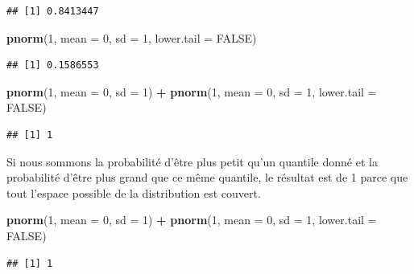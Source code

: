 \documentclass[
]{book}
\newenvironment{Shaded}{\begin{snugshade}}{\end{snugshade}}
\newcommand{\AttributeTok}[1]{\textcolor[rgb]{0.13,0.29,0.53}{#1}}
\newcommand{\ConstantTok}[1]{\textcolor[rgb]{0.56,0.35,0.01}{#1}}
\newcommand{\DecValTok}[1]{\textcolor[rgb]{0.00,0.00,0.81}{#1}}
\newcommand{\FunctionTok}[1]{\textcolor[rgb]{0.13,0.29,0.53}{\textbf{#1}}}
\newcommand{\NormalTok}[1]{#1}
\newcommand{\SpecialCharTok}[1]{\textcolor[rgb]{0.81,0.36,0.00}{\textbf{#1}}}
\begin{document}
\begin{verbatim}
## [1] 0.8413447
\end{verbatim}

\begin{Shaded}
\begin{Highlighting}[]
\FunctionTok{pnorm}\NormalTok{(}\DecValTok{1}\NormalTok{, }\AttributeTok{mean =} \DecValTok{0}\NormalTok{, }\AttributeTok{sd =} \DecValTok{1}\NormalTok{, }\AttributeTok{lower.tail =} \ConstantTok{FALSE}\NormalTok{)}
\end{Highlighting}
\end{Shaded}

\begin{verbatim}
## [1] 0.1586553
\end{verbatim}

\begin{Shaded}
\begin{Highlighting}[]
\FunctionTok{pnorm}\NormalTok{(}\DecValTok{1}\NormalTok{, }\AttributeTok{mean =} \DecValTok{0}\NormalTok{, }\AttributeTok{sd =} \DecValTok{1}\NormalTok{) }\SpecialCharTok{+} \FunctionTok{pnorm}\NormalTok{(}\DecValTok{1}\NormalTok{, }\AttributeTok{mean =} \DecValTok{0}\NormalTok{, }\AttributeTok{sd =} \DecValTok{1}\NormalTok{, }\AttributeTok{lower.tail =} \ConstantTok{FALSE}\NormalTok{)}
\end{Highlighting}
\end{Shaded}

\begin{verbatim}
## [1] 1
\end{verbatim}

Si nous sommons la probabilité d'être plus petit qu'un quantile donné et la probabilité d'être plus grand que ce même quantile, le résultat est de 1 parce que tout l'espace possible de la distribution est couvert.

\begin{Shaded}
\begin{Highlighting}[]
\FunctionTok{pnorm}\NormalTok{(}\DecValTok{1}\NormalTok{, }\AttributeTok{mean =} \DecValTok{0}\NormalTok{, }\AttributeTok{sd =} \DecValTok{1}\NormalTok{) }\SpecialCharTok{+} \FunctionTok{pnorm}\NormalTok{(}\DecValTok{1}\NormalTok{, }\AttributeTok{mean =} \DecValTok{0}\NormalTok{, }\AttributeTok{sd =} \DecValTok{1}\NormalTok{, }\AttributeTok{lower.tail =} \ConstantTok{FALSE}\NormalTok{)}
\end{Highlighting}
\end{Shaded}

\begin{verbatim}
## [1] 1
\end{verbatim}
\end{document}
